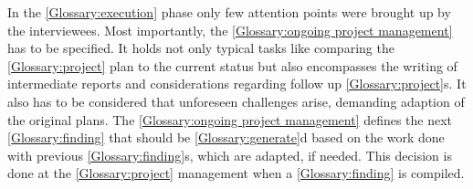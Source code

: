 \documentclass{bausteinefdm}
\begin{document}





In the \ref{Glossary:execution} phase only few attention points were brought up by the interviewees.
Most importantly, the \ref{Glossary:ongoing project management} has to be specified.
It holds not only typical tasks like comparing the \ref{Glossary:project} plan to the current status but also encompasses the writing of intermediate reports and considerations regarding follow up \ref{Glossary:project}s.
It also has to be considered that unforeseen challenges arise, demanding adaption of the original plans. 
The \ref{Glossary:ongoing project management} defines the next \ref{Glossary:finding} that should be \ref{Glossary:generate}d based on the work done with previous \ref{Glossary:finding}s, which are adapted, if needed.
This decision is done at the \ref{Glossary:project} management when a \ref{Glossary:finding} is compiled.
\end{document}
